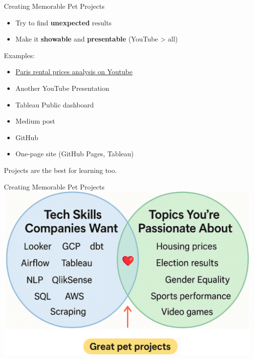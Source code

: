 \documentclass[10pt,a4paper]{article}
\begin{document}
\begin{multicols}{3}
\begin{textboxRed}{Creating Memorable Pet Projects}
\begin{itemize}
    \item Try to find \textbf{unexpected} results
    \item Make it \textbf{showable} and \textbf{presentable} (YouTube > all)
\end{itemize}

Examples:
\begin{itemize}
    \item \href{https://youtube.com/watch?v=HKuhMtrEgDE}{Paris rental prices analysis on Youtube}
    \item Another YouTube Presentation
    \item Tableau Public dashboard
    \item Medium post
    \item GitHub
    \item One-page site (GitHub Pages, Tableau)
\end{itemize}

Projects are the best for learning too.
\end{textboxRed}

\begin{textboxRed}{Creating Memorable Pet Projects}
\includegraphics[width=\textwidth]{image.png}
\end{textboxRed}


\end{multicols}
\end{document}
